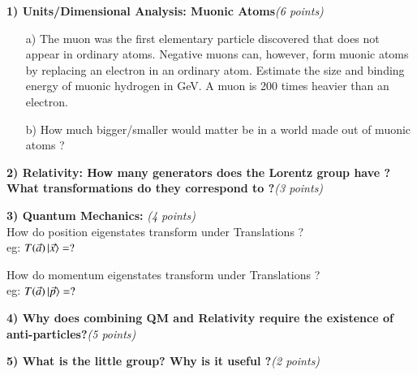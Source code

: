 {\large




\textbf{1) Units/Dimensional Analysis:  Muonic Atoms}\hfill \textit{(6 points)}\\  

\begin{itemize}
\item[a)] The muon was the first elementary particle discovered that does not appear in ordinary atoms.  Negative muons can, however, form muonic atoms by replacing an electron in an ordinary atom. 
Estimate the size and binding energy of muonic hydrogen in GeV. A muon is 200 times heavier than an electron. 
\vspace*{3in}
\item[b)] How much bigger/smaller would matter be in a world made out of muonic atoms ?
\vspace*{3in}
\end{itemize}

\textbf{2)  Relativity: How many generators does the Lorentz group have ? What transformations do they correspond to ?}\hfill \textit{(3 points)}\\

\vspace*{2in}


\textbf{3)  Quantum Mechanics:  }\hfill \textit{(4 points)}\\

How do position eigenstates transform under  Translations ?\\
eg: $T(\vec{a}) \ket{\vec{x}} = ?$

\vspace*{1in}

How do momentum eigenstates transform under Translations ?\\
eg: $T(\vec{a}) \ket{\vec{p}} = ?$

\vspace*{1in}


\textbf{4) Why does combining QM and Relativity require the existence of anti-particles?}\hfill \textit{(5 points)}\\

\clearpage

\textbf{5) What is the little group? Why is it useful ?}\hfill \textit{(2 points)}\\

\vspace*{1in}

}
